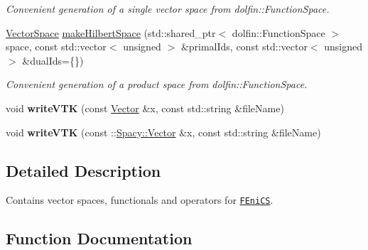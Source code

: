 \begin{DoxyCompactItemize}
\begin{DoxyCompactList}\small\item\em Convenient generation of a single vector space from dolfin\+::\+Function\+Space. \end{DoxyCompactList}\item 
\hyperlink{classSpacy_1_1VectorSpace}{Vector\+Space} \hyperlink{group__FenicsGroup_ga79df66c976cab487d2013de25c17bb39}{make\+Hilbert\+Space} (std\+::shared\+\_\+ptr$<$ dolfin\+::\+Function\+Space $>$ space, const std\+::vector$<$ unsigned $>$ \&primal\+Ids, const std\+::vector$<$ unsigned $>$ \&dual\+Ids=\{\})
\begin{DoxyCompactList}\small\item\em Convenient generation of a product space from dolfin\+::\+Function\+Space. \end{DoxyCompactList}\item 
void {\bfseries write\+V\+TK} (const \hyperlink{classSpacy_1_1FEniCS_1_1Vector}{Vector} \&x, const std\+::string \&file\+Name)\hypertarget{namespaceSpacy_1_1FEniCS_a9a327f617c26b4ea7b8d3fb68236cf6d}{}\label{namespaceSpacy_1_1FEniCS_a9a327f617c26b4ea7b8d3fb68236cf6d}

\item 
void {\bfseries write\+V\+TK} (const \+::\hyperlink{classSpacy_1_1Vector}{Spacy\+::\+Vector} \&x, const std\+::string \&file\+Name)\hypertarget{namespaceSpacy_1_1FEniCS_a6e2e0e8c0892338ec1cda88d75824086}{}\label{namespaceSpacy_1_1FEniCS_a6e2e0e8c0892338ec1cda88d75824086}

\end{DoxyCompactItemize}


\subsection{Detailed Description}
Contains vector spaces, functionals and operators for \href{www.fenicsproject.org}{\tt F\+Eni\+CS}. 

\subsection{Function Documentation}
